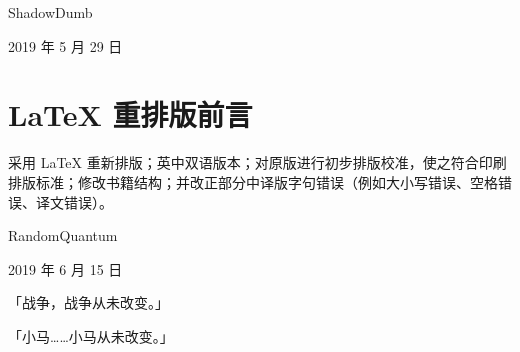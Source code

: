 \begin{flushright}
ShadowDumb

2019 年 5 月 29 日
\end{flushright}


\section*{\LaTeX{} 重排版前言}

采用 \LaTeX{} 重新排版；英中双语版本；对原版进行初步排版校准，使之符合印刷排版标准；修改书籍结构；并改正部分中译版字句错误（例如大小写错误、空格错误、译文错误）。

\begin{flushright}
RandomQuantum

2019 年 6 月 15 日
\end{flushright}

\clearpage

\begin{motto}
「战争，战争从未改变。」

\medskip

「小马……小马从未改变。」
\end{motto}

